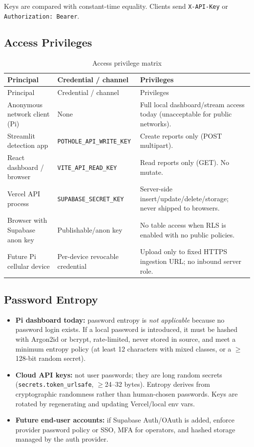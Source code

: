 \documentclass[12pt]{article}
\newcommand{\toprule}{\hline}
\newcommand{\midrule}{\hline}
\newcommand{\bottomrule}{\hline}
\begin{document}
Keys are compared with constant-time equality. Clients send
\texttt{X-API-Key} or \texttt{Authorization: Bearer}.

\subsection{Access Privileges}

\begin{longtable}{p{}p{}p{}}
\caption{Access privilege matrix}\label{tab:privileges}\\
\toprule
Principal & Credential / channel & Privileges \\
\midrule
\endfirsthead
\toprule
Principal & Credential / channel & Privileges \\
\midrule
\endhead
Anonymous network client (Pi) & None & Full local dashboard/stream access today (unacceptable for public networks). \\
Streamlit detection app & \texttt{POTHOLE\_API\_WRITE\_KEY} & Create reports only (POST multipart). \\
React dashboard / browser & \texttt{VITE\_API\_READ\_KEY} & Read reports only (GET). No mutate. \\
Vercel API process & \texttt{SUPABASE\_SECRET\_KEY} & Server-side insert/update/delete/storage; never shipped to browsers. \\
Browser with Supabase anon key & Publishable/anon key & No table access when RLS is enabled with no public policies. \\
Future Pi cellular device & Per-device revocable credential & Upload only to fixed HTTPS ingestion URL; no inbound server role. \\
\bottomrule
\end{longtable}

\subsection{Password Entropy}

\begin{itemize}
    \item \textbf{Pi dashboard today:} password entropy is \emph{not applicable}
          because no password login exists. If a local password is introduced, it
          must be hashed with Argon2id or bcrypt, rate-limited, never stored in
          source, and meet a minimum entropy policy (at least 12 characters with
          mixed classes, or a $\geq$128-bit random secret).
    \item \textbf{Cloud API keys:} not user passwords; they are long random
          secrets (\texttt{secrets.token\_urlsafe}, $\geq$24--32 bytes). Entropy
          derives from cryptographic randomness rather than human-chosen
          passwords. Keys are rotated by regenerating and updating Vercel/local
          env vars.
    \item \textbf{Future end-user accounts:} if Supabase Auth/OAuth is added,
          enforce provider password policy or SSO, MFA for operators, and hashed
          storage managed by the auth provider.
\end{itemize}
\end{document}
